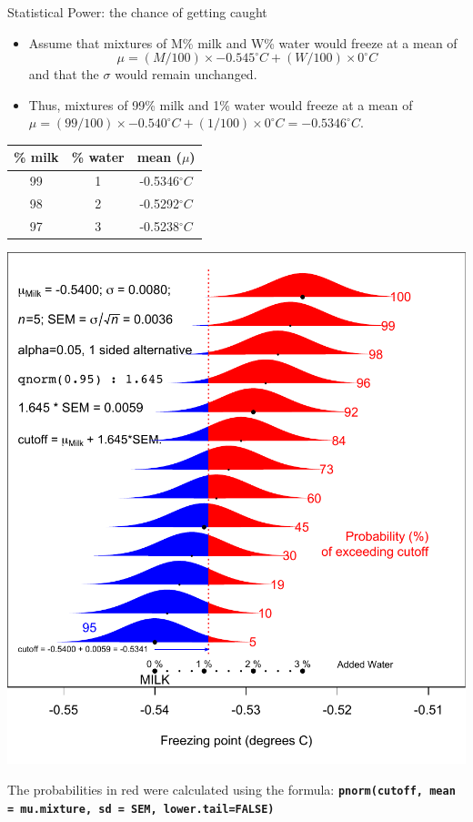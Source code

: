 \documentclass{beamer}\usepackage[]{graphicx}\usepackage[]{color}
\begin{document}
\begin{frame}{Statistical Power: the chance of getting caught}
\small
\begin{itemize}
	\setlength\itemsep{1em}
	\item Assume that  mixtures of M\% milk and W\% water  would freeze at a mean of $$\mu =  (M/100) \times -0.545^{\circ}C + (W/100) \times 0 ^{\circ}C$$ and that the $\sigma$ would remain unchanged. \pause 
	\item Thus, mixtures of 99\% milk and 1\% water  would freeze at a mean of $\mu =  (99/100) \times -0.540^{\circ}C + (1/100) \times 0 ^{\circ}C = -0.5346 ^{\circ} C.$ 
	\end{itemize}

\begin{center}
	\begin{tabular}{|c|c|c|}
		\hline 
		\% milk & \% water & mean ($\mu$) \\ 
		\hline 
		99 & 1 & -0.5346$^{\circ}C$ \\ 
		98 & 2 & -0.5292$^{\circ}C$ \\ 
		97 & 3 & -0.5238$^{\circ}C$ \\ 
		\hline 
	\end{tabular} 
\end{center}
\end{frame}

\begin{frame}

\begin{center}
	\includegraphics[scale=0.45]{ProbDetectingWaterInMilk.pdf} 
\end{center}

{ \footnotesize
	The probabilities in red were calculated using the formula:
	\texttt{\textbf{pnorm(cutoff, mean = mu.mixture, sd = SEM, lower.tail=FALSE)}} 
}
\end{frame}
\end{document}
